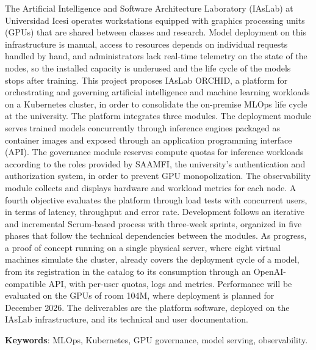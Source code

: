 \documentclass[letterpaper,11pt]{report}
\begin{document}
The Artificial Intelligence and Software Architecture Laboratory (IAsLab) at Universidad Icesi operates workstations equipped with graphics processing units (GPUs) that are shared between classes and research. Model deployment on this infrastructure is manual, access to resources depends on individual requests handled by hand, and administrators lack real-time telemetry on the state of the nodes, so the installed capacity is underused and the life cycle of the models stops after training. This project proposes IAsLab ORCHID, a platform for orchestrating and governing artificial intelligence and machine learning workloads on a Kubernetes cluster, in order to consolidate the on-premise MLOps life cycle at the university. The platform integrates three modules. The deployment module serves trained models concurrently through inference engines packaged as container images and exposed through an application programming interface (API). The governance module reserves compute quotas for inference workloads according to the roles provided by SAAMFI, the university's authentication and authorization system, in order to prevent GPU monopolization. The observability module collects and displays hardware and workload metrics for each node. A fourth objective evaluates the platform through load tests with concurrent users, in terms of latency, throughput and error rate. Development follows an iterative and incremental Scrum-based process with three-week sprints, organized in five phases that follow the technical dependencies between the modules. As progress, a proof of concept running on a single physical server, where eight virtual machines simulate the cluster, already covers the deployment cycle of a model, from its registration in the catalog to its consumption through an OpenAI-compatible API, with per-user quotas, logs and metrics. Performance will be evaluated on the GPUs of room 104M, where deployment is planned for December 2026. The deliverables are the platform software, deployed on the IAsLab infrastructure, and its technical and user documentation.

\medskip
\noindent \textbf{Keywords}: MLOps, Kubernetes, GPU governance, model serving, observability.

\end{document}
